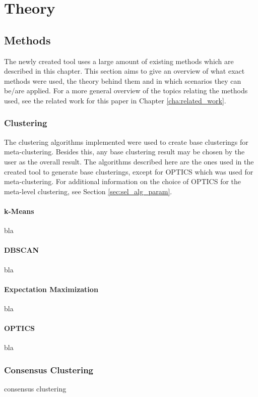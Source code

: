 \documentclass[
	a4paper,
	english,
	twoside,
	openright,               
	11pt                            
	]{report}
\begin{document}
\part{Theory}
\chapter{Methods}
The newly created tool uses a large amount of existing methods which are described in this chapter. This section aims to give an overview of what exact methods were used, the theory behind them and in which scenarios they can be/are applied. For a more general overview of the topics relating the methods used, see the related work for this paper in Chapter \ref{cha:related_work}.

\section{Clustering}
The clustering algorithms implemented were used to create base clusterings for meta-clustering. Besides this, any base clustering result may be chosen by the user as the overall result. The algorithms described here are the ones used in the created tool to generate base clusterings, except for OPTICS which was used for meta-clustering. For additional information on the choice of OPTICS for the meta-level clustering, see Section \ref{sec:sel_alg_param}.

\subsection{k-Means}
bla

\subsection{DBSCAN}
bla

\subsection{Expectation Maximization}
bla

\subsection{OPTICS}\label{sec:opticstheory}
bla

\section{Consensus Clustering}
consensus clustering
\end{document}

